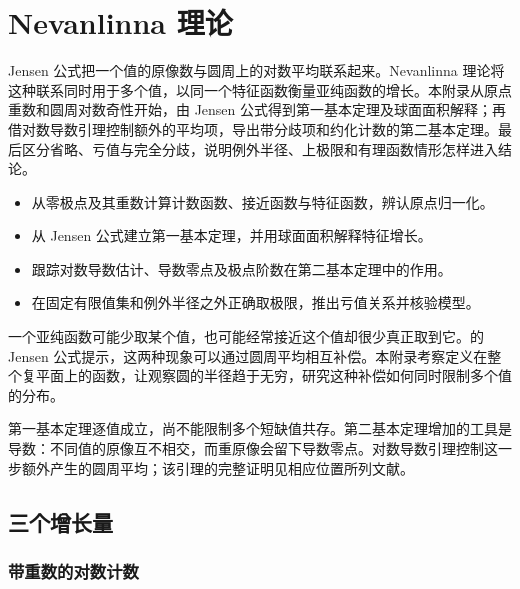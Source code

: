 \chapter{Nevanlinna 理论}
\label{b3:app:C}
\begin{chapterabstract}
Jensen 公式把一个值的原像数与圆周上的对数平均联系起来。Nevanlinna 理论将这种联系同时用于多个值，以同一个特征函数衡量亚纯函数的增长。本附录从原点重数和圆周对数奇性开始，由 Jensen 公式得到第一基本定理及球面面积解释；再借对数导数引理控制额外的平均项，导出带分歧项和约化计数的第二基本定理。最后区分省略、亏值与完全分歧，说明例外半径、上极限和有理函数情形怎样进入结论。
\end{chapterabstract}
\begin{learninggoals}
\begin{itemize}
\item\label{b3:item:C-goal-1}从零极点及其重数计算计数函数、接近函数与特征函数，辨认原点归一化。
\item\label{b3:item:C-goal-2}从 Jensen 公式建立第一基本定理，并用球面面积解释特征增长。
\item\label{b3:item:C-goal-3}跟踪对数导数估计、导数零点及极点阶数在第二基本定理中的作用。
\item\label{b3:item:C-goal-4}在固定有限值集和例外半径之外正确取极限，推出亏值关系并核验模型。
\end{itemize}
\end{learninggoals}

一个亚纯函数可能少取某个值，也可能经常接近这个值却很少真正取到它。的 Jensen 公式提示，这两种现象可以通过圆周平均相互补偿。本附录考察定义在整个复平面上的函数，让观察圆的半径趋于无穷，研究这种补偿如何同时限制多个值的分布。

\ProseParagraphBreak

第一基本定理逐值成立，尚不能限制多个短缺值共存。第二基本定理增加的工具是导数：不同值的原像互不相交，而重原像会留下导数零点。对数导数引理控制这一步额外产生的圆周平均；该引理的完整证明见相应位置所列文献。

\section{三个增长量}
\label{b3:sec:C01}

\subsection{带重数的对数计数}
\label{b3:subsec:C0101}

